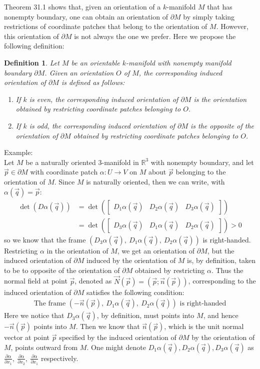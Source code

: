 \documentclass[15pt]{book}
\theoremstyle{break}
\theoremstyle{break}
\newtheorem{defn}{Definition}[corL]
\newcommand{\R}{\mathbb{R}}
\newcommand{\bmat}[1]{\begin{bmatrix} #1 \end{bmatrix}}
\newcommand{\example}{\color{green}Example: \color{black}}
\begin{document}
\hfill\break
\hfill\break
Theorem 31.1 shows that, given an orientation of a $k$-manifold $M$ that has nonempty boundary, one can obtain an orientation of $\partial M$ by simply taking restrictions of coordinate patches that belong to the orientation of $M$. However, this orientation of $\partial M$ is not always the one we prefer. Here we propose the following definition:
\begin{defn}
Let $M$ be an orientable $k$-manifold with nonempty manifold boundary $\partial M$. Given an orientation $O$ of $M$, the corresponding induced orientation of $\partial M$ is defined as follows:
\begin{enumerate}[topsep=3pt,itemsep=-1ex,partopsep=1ex,parsep=1ex]
\item If $k$ is even, the corresponding induced orientation of $\partial M$ is the orientation obtained by restricting coordinate patches belonging to $O$.
\item If $k$ is odd, the corresponding induced orientation of $\partial M$ is the opposite of the orientation of $\partial M$ obtained by restricting coordinate patches belonging to $O$.
\end{enumerate}
\end{defn}

\example \\
Let $M$ be a naturally oriented $3$-manifold in $\R^3$ with nonempty boundary, and let $\vec{p}\in \partial M$ with coordinate patch $\alpha: U \to V$ on $M$ about $\vec{p}$ belonging to the orientation of $M$. Since $M$ is naturally oriented, then we can write, with $\alpha(\vec{q}) = \vec{p}$:
\begin{align*}
\det(D\alpha(\vec{q})) 
&=\det \left(\bmat{D_1\alpha(\vec{q}) & D_2\alpha(\vec{q})& D_3\alpha(\vec{q})}\right) \\
&=\det \left(\bmat{D_3\alpha(\vec{q}) & D_1\alpha(\vec{q})& D_2\alpha(\vec{q})}\right)>0
\end{align*}
so we know that the frame $( D_3\alpha(\vec{q}),\ D_1\alpha(\vec{q}),\ D_2\alpha(\vec{q}))$ is right-handed. Restricting $\alpha$ in the orientation of $M$, we get an orientation of $\partial M$, but the induced orientation of $\partial M$ induced by the orientation of $M$ is, by definition, taken to be to opposite of the orientation of $\partial M$ obtained by restricting $\alpha$. Thus the normal field at point $\vec{p}$, denoted as $\vec{N}(\vec{p}) = (\vec{p}; \vec{n}(\vec{p}))$,  corresponding to the induced orientation of $\partial M$ satisfies the following condition:
\begin{align*}
\text{The frame }\left(-\vec{n}(\vec{p}),\ D_1\alpha(\vec{q}), \ D_2\alpha(\vec{q}) \right) \text{ is right-handed}
\end{align*}
Here we notice that $D_3\alpha(\vec{q})$, by definition, must points into $M$, and hence $-\vec{n}(\vec{p})$ points into $M$. Then we know that $\vec{n}(\vec{p})$, which is the unit normal vector at point $\vec{p}$ specified by the induced orientation of $\partial M$ by the orientation of $M$, points outward from $M$. One might denote $D_1\alpha(\vec{q}), D_2\alpha(\vec{q}), D_3\alpha(\vec{q})$ as $\frac{\partial \alpha}{\partial x_1},\ \frac{\partial \alpha}{\partial x_2},\ \frac{\partial \alpha}{\partial x_1}$ respectively.
\end{document}

